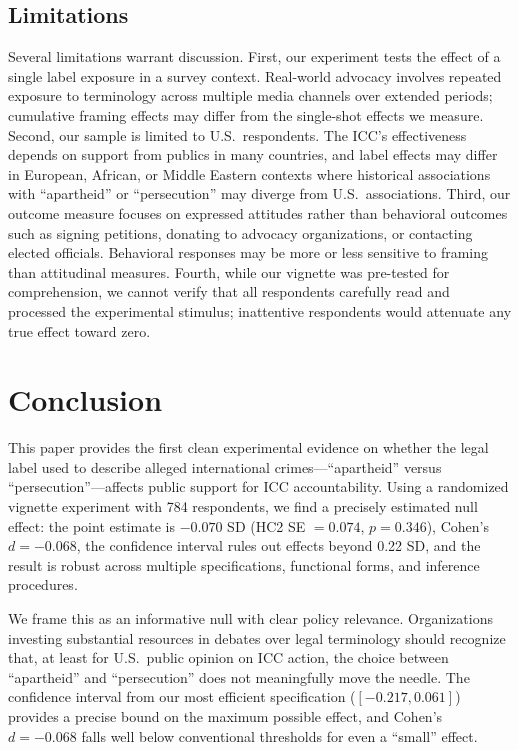 \documentclass[12pt]{article}
\begin{document}
\subsection{Limitations}

Several limitations warrant discussion. First, our experiment tests the effect of a single label exposure in a survey context. Real-world advocacy involves repeated exposure to terminology across multiple media channels over extended periods; cumulative framing effects may differ from the single-shot effects we measure. Second, our sample is limited to U.S.\ respondents. The ICC's effectiveness depends on support from publics in many countries, and label effects may differ in European, African, or Middle Eastern contexts where historical associations with ``apartheid'' or ``persecution'' may diverge from U.S.\ associations. Third, our outcome measure focuses on expressed attitudes rather than behavioral outcomes such as signing petitions, donating to advocacy organizations, or contacting elected officials. Behavioral responses may be more or less sensitive to framing than attitudinal measures. Fourth, while our vignette was pre-tested for comprehension, we cannot verify that all respondents carefully read and processed the experimental stimulus; inattentive respondents would attenuate any true effect toward zero.

\section{Conclusion}
\label{sec:conclusion}

This paper provides the first clean experimental evidence on whether the legal label used to describe alleged international crimes---``apartheid'' versus ``persecution''---affects public support for ICC accountability. Using a randomized vignette experiment with 784 respondents, we find a precisely estimated null effect: the point estimate is $-0.070$ SD (HC2 SE $= 0.074$, $p = 0.346$), Cohen's $d = -0.068$, the confidence interval rules out effects beyond 0.22 SD, and the result is robust across multiple specifications, functional forms, and inference procedures.

We frame this as an informative null with clear policy relevance. Organizations investing substantial resources in debates over legal terminology should recognize that, at least for U.S.\ public opinion on ICC action, the choice between ``apartheid'' and ``persecution'' does not meaningfully move the needle. The confidence interval from our most efficient specification ($[-0.217, 0.061]$) provides a precise bound on the maximum possible effect, and Cohen's $d = -0.068$ falls well below conventional thresholds for even a ``small'' effect.
\end{document}
